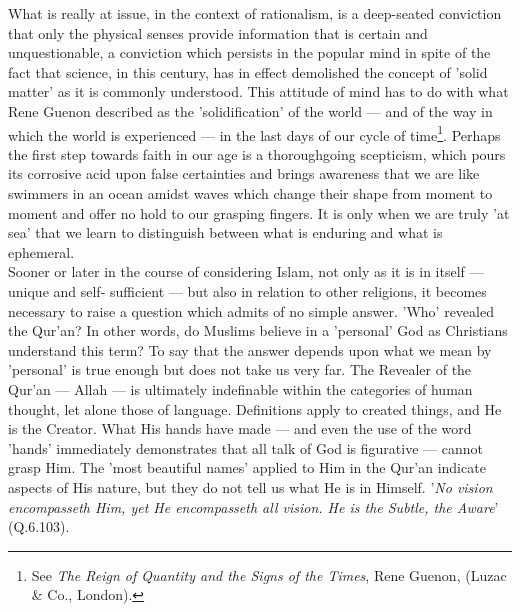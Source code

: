 \documentclass[11pt, b5paper, twoside]{book}
\begin{document}
What is really at issue, in the context of rationalism, is a deep-seated conviction that only the 
physical senses provide information that is certain and unquestionable, a conviction which persists 
in the popular mind in spite of the fact that science, in this century, has in effect demolished the 
concept of 'solid matter' as it is commonly understood. This attitude of mind has to do with what 
Rene Guenon described as the 'solidification' of the world --- and of the way in which the world is 
experienced --- in the last days of our cycle of time\footnote{See \emph{The Reign of Quantity and the Signs of the Times}, Rene Guenon, (Luzac \& Co., London).}. Perhaps the first step towards faith in our 
age is a thoroughgoing scepticism, which pours its corrosive acid upon false certainties and brings 
awareness that we are like swimmers in an ocean amidst waves which change their shape from moment to moment and offer no hold to our grasping fingers. It is only when we are truly 'at sea' that we learn 
to distinguish between what is enduring and what is ephemeral. \\

Sooner or later in the course of considering Islam, not only as it is in itself --- unique and self-
sufficient --- but also in relation to other religions, it becomes necessary to raise a question which 
admits of no simple answer. 'Who' revealed the Qur'an? In other words, do Muslims believe in a 
'personal' God as Christians understand this term? To say that the answer depends upon what we mean 
by 'personal' is true enough but does not take us very far. The Revealer of the Qur'an --- Allah --- is 
ultimately indefinable within the categories of human thought, let alone those of language. 
Definitions apply to created things, and He is the Creator. What His hands have made --- and even the 
use of the word 'hands' immediately demonstrates that all talk of God is figurative --- cannot grasp 
Him. The 'most beautiful names' applied to Him in the Qur'an indicate aspects of His nature, but they 
do not tell us what He is in Himself. '\emph{No vision encompasseth Him, yet He encompasseth all vision. He is the Subtle, the Aware}' (Q.6.103). \\
\end{document}
